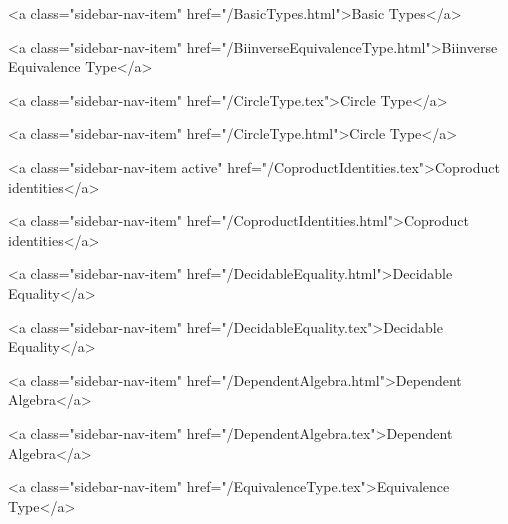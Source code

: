       
    
      
        
          <a class="sidebar-nav-item" href="/BasicTypes.html">Basic Types</a>
        
      
    
      
        
          <a class="sidebar-nav-item" href="/BiinverseEquivalenceType.html">Biinverse Equivalence Type</a>
        
      
    
      
        
          <a class="sidebar-nav-item" href="/CircleType.tex">Circle Type</a>
        
      
    
      
        
          <a class="sidebar-nav-item" href="/CircleType.html">Circle Type</a>
        
      
    
      
        
          <a class="sidebar-nav-item active" href="/CoproductIdentities.tex">Coproduct identities</a>
        
      
    
      
        
          <a class="sidebar-nav-item" href="/CoproductIdentities.html">Coproduct identities</a>
        
      
    
      
        
          <a class="sidebar-nav-item" href="/DecidableEquality.html">Decidable Equality</a>
        
      
    
      
        
          <a class="sidebar-nav-item" href="/DecidableEquality.tex">Decidable Equality</a>
        
      
    
      
        
          <a class="sidebar-nav-item" href="/DependentAlgebra.html">Dependent Algebra</a>
        
      
    
      
        
          <a class="sidebar-nav-item" href="/DependentAlgebra.tex">Dependent Algebra</a>
        
      
    
      
        
          <a class="sidebar-nav-item" href="/EquivalenceType.tex">Equivalence Type</a>
        

